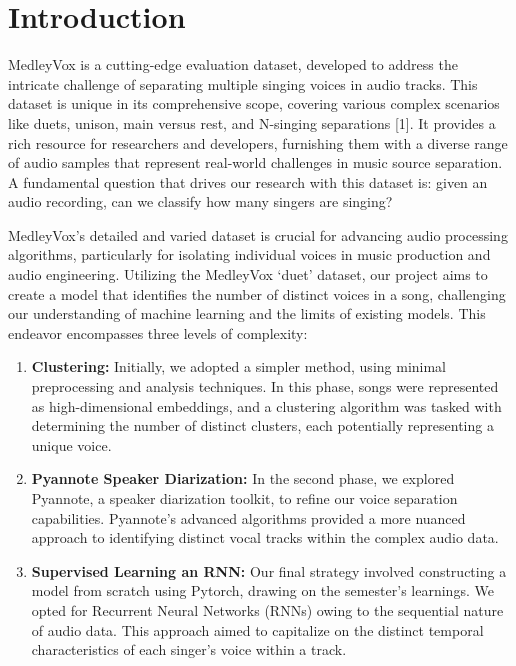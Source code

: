\documentclass[conference]{IEEEtran}
\begin{document}
\section{Introduction}
MedleyVox is a cutting-edge evaluation dataset, developed to address the intricate challenge of separating multiple singing voices in audio tracks. This dataset is unique in its comprehensive scope, covering various complex scenarios like duets, unison, main versus rest, and N-singing separations [1]. It provides a rich resource for researchers and developers, furnishing them with a diverse range of audio samples that represent real-world challenges in music source separation. A fundamental question that drives our research with this dataset is: given an audio recording, can we classify how many singers are singing?

MedleyVox's detailed and varied dataset is crucial for advancing audio processing algorithms, particularly for isolating individual voices in music production and audio engineering. Utilizing the MedleyVox `duet' dataset, our project aims to create a model that identifies the number of distinct voices in a song, challenging our understanding of machine learning and the limits of existing models. This endeavor encompasses three levels of complexity:

\begin{enumerate}
    \item \textbf{Clustering:} Initially, we adopted a simpler method, using minimal preprocessing and analysis techniques. In this phase, songs were represented as high-dimensional embeddings, and a clustering algorithm was tasked with determining the number of distinct clusters, each potentially representing a unique voice.
    \item \textbf{Pyannote Speaker Diarization:} In the second phase, we explored Pyannote, a speaker diarization toolkit, to refine our voice separation capabilities. Pyannote's advanced algorithms provided a more nuanced approach to identifying distinct vocal tracks within the complex audio data.
    \item \textbf{Supervised Learning an RNN:} Our final strategy involved constructing a model from scratch using Pytorch, drawing on the semester's learnings. We opted for Recurrent Neural Networks (RNNs) owing to the sequential nature of audio data. This approach aimed to capitalize on the distinct temporal characteristics of each singer's voice within a track.
    \end{enumerate}
\end{document}
